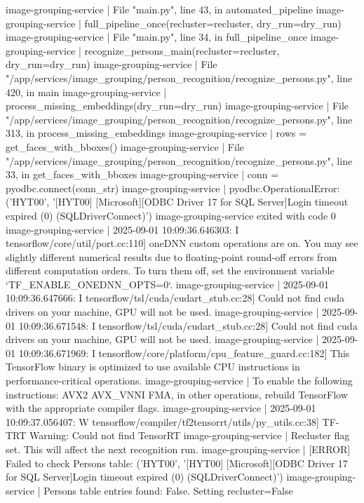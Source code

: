 image-grouping-service  |   File "main.py", line 43, in automated_pipeline
image-grouping-service  |     full_pipeline_once(recluster=recluster, dry_run=dry_run)
image-grouping-service  |   File "main.py", line 34, in full_pipeline_once
image-grouping-service  |     recognize_persons_main(recluster=recluster, dry_run=dry_run)
image-grouping-service  |   File "/app/services/image_grouping/person_recognition/recognize_persons.py", line 420, in main
image-grouping-service  |     process_missing_embeddings(dry_run=dry_run)
image-grouping-service  |   File "/app/services/image_grouping/person_recognition/recognize_persons.py", line 313, in process_missing_embeddings
image-grouping-service  |     rows = get_faces_with_bboxes()
image-grouping-service  |   File "/app/services/image_grouping/person_recognition/recognize_persons.py", line 33, in get_faces_with_bboxes
image-grouping-service  |     conn = pyodbc.connect(conn_str)
image-grouping-service  | pyodbc.OperationalError: ('HYT00', '[HYT00] [Microsoft][ODBC Driver 17 for SQL Server]Login timeout expired (0) (SQLDriverConnect)')
image-grouping-service exited with code 0
image-grouping-service  | 2025-09-01 10:09:36.646303: I tensorflow/core/util/port.cc:110] oneDNN custom operations are on. You may see slightly different numerical results due to floating-point round-off errors from different computation orders. To turn them off, set the environment variable `TF_ENABLE_ONEDNN_OPTS=0`.
image-grouping-service  | 2025-09-01 10:09:36.647666: I tensorflow/tsl/cuda/cudart_stub.cc:28] Could not find cuda drivers on your machine, GPU will not be used.
image-grouping-service  | 2025-09-01 10:09:36.671548: I tensorflow/tsl/cuda/cudart_stub.cc:28] Could not find cuda drivers on your machine, GPU will not be used.
image-grouping-service  | 2025-09-01 10:09:36.671969: I tensorflow/core/platform/cpu_feature_guard.cc:182] This TensorFlow binary is optimized to use available CPU instructions in performance-critical operations.
image-grouping-service  | To enable the following instructions: AVX2 AVX_VNNI FMA, in other operations, rebuild TensorFlow with the appropriate compiler flags.
image-grouping-service  | 2025-09-01 10:09:37.056407: W tensorflow/compiler/tf2tensorrt/utils/py_utils.cc:38] TF-TRT Warning: Could not find TensorRT
image-grouping-service  | Recluster flag set. This will affect the next recognition run.
image-grouping-service  | [ERROR] Failed to check Persons table: ('HYT00', '[HYT00] [Microsoft][ODBC Driver 17 for SQL Server]Login timeout expired (0) (SQLDriverConnect)')
image-grouping-service  | Persons table entries found: False. Setting recluster=False
